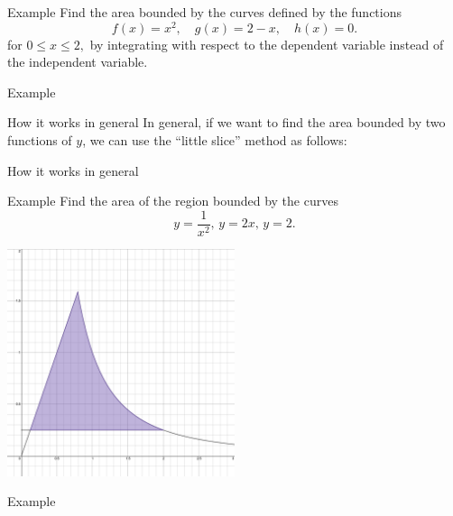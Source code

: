 \documentclass[presentation]{beamer}
\begin{document}
\begin{frame}[label={sec:org42e986c}]{Example}
Find the area bounded by the curves defined by the functions
\[ f \left( x \right) = x^2, \quad g \left( x \right) = 2-x, \quad h
\left( x \right) = 0. \]
for \(0 \le x \le 2,\) by integrating with respect to the dependent
variable instead of the independent variable.
\vspace{10in}
\end{frame}

\begin{frame}[label={sec:orgb871cfa}]{Example}
\end{frame}

\begin{frame}[label={sec:org0995c76}]{How it works in general}
In general, if we want to find the area bounded by two functions of
\(y\), we can use the ``little slice'' method as follows:
\vspace{10in}
\end{frame}

\begin{frame}[label={sec:org71b9298}]{How it works in general}
\end{frame}

\begin{frame}[label={sec:org9d0d93f}]{Example}
Find the area of the region bounded by the curves
\[ y = \frac{1}{x^2}, \, y = 2x, \, y = 2. \]
\begin{center}
\includegraphics[width=0.5\textwidth]{../img/day005-ex2.png}
\end{center}
\end{frame}

\begin{frame}[label={sec:orga091098}]{Example}
\end{frame}
\end{document}

